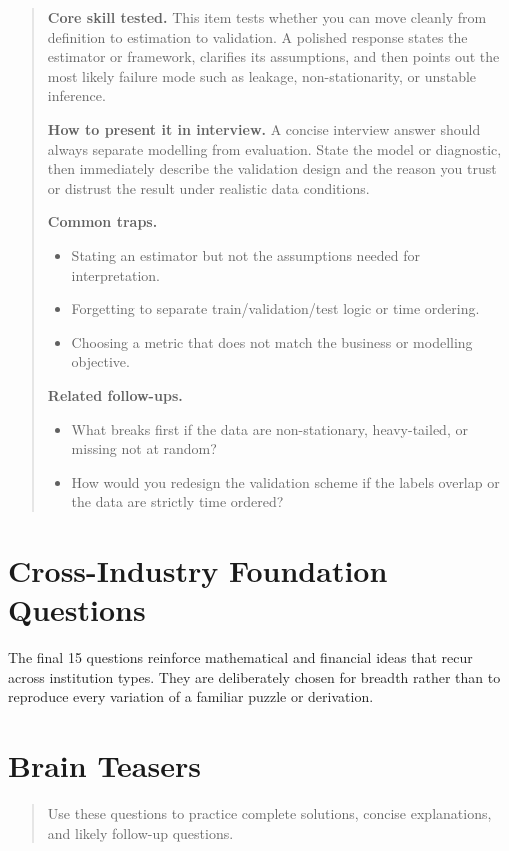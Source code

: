 \documentclass[11pt,letterpaper,openany]{book}
\newcommand{\ChapterIntro}[1]{%
  \begin{quote}\small #1\end{quote}%
}
\newenvironment{EditorialNote}
  {\begin{quote}\small\setlength{\parskip}{0.25em}}
  {\end{quote}}
\newcommand{\QuestionSpacer}{\vspace{0.4em}}
\begin{document}
\begin{EditorialNote}


\textbf{Core skill tested.} This item tests whether you can move cleanly from definition to estimation to validation. A polished response states the estimator or framework, clarifies its assumptions, and then points out the most likely failure mode such as leakage, non-stationarity, or unstable inference.

\textbf{How to present it in interview.} A concise interview answer should always separate modelling from evaluation. State the model or diagnostic, then immediately describe the validation design and the reason you trust or distrust the result under realistic data conditions.

\textbf{Common traps.}
\begin{itemize}
\item Stating an estimator but not the assumptions needed for interpretation.
\item Forgetting to separate train/validation/test logic or time ordering.
\item Choosing a metric that does not match the business or modelling objective.
\end{itemize}

\textbf{Related follow-ups.}
\begin{itemize}
\item What breaks first if the data are non-stationary, heavy-tailed, or missing not at random?
\item How would you redesign the validation scheme if the labels overlap or the data are strictly time ordered?
\end{itemize}


\end{EditorialNote}
\QuestionSpacer
\section*{Cross-Industry Foundation Questions}
The final 15 questions reinforce mathematical and financial ideas that recur across institution types. They are deliberately chosen for breadth rather than to reproduce every variation of a familiar puzzle or derivation.
\section{Brain Teasers}

\ChapterIntro{Use these questions to practice complete solutions, concise explanations, and likely follow-up questions.}
\end{document}
